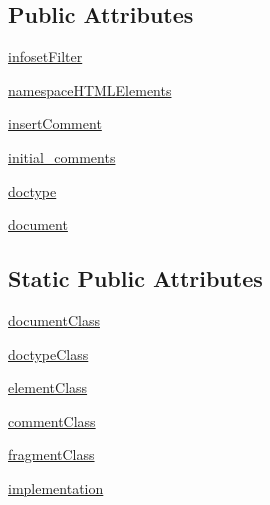 \subsection*{Public Attributes}
\begin{DoxyCompactItemize}
\item 
\hyperlink{classpip_1_1__vendor_1_1html5lib_1_1treebuilders_1_1etree__lxml_1_1TreeBuilder_a736bfdbe661982ba121bb4dcfd958591}{infoset\+Filter}
\item 
\hyperlink{classpip_1_1__vendor_1_1html5lib_1_1treebuilders_1_1etree__lxml_1_1TreeBuilder_aeea224b3d93acc67bdbc729992c7ad70}{namespace\+H\+T\+M\+L\+Elements}
\item 
\hyperlink{classpip_1_1__vendor_1_1html5lib_1_1treebuilders_1_1etree__lxml_1_1TreeBuilder_a7591236b31194f2fd655b8da87761723}{insert\+Comment}
\item 
\hyperlink{classpip_1_1__vendor_1_1html5lib_1_1treebuilders_1_1etree__lxml_1_1TreeBuilder_ab34ddb701de259acf247be3553d230d9}{initial\+\_\+comments}
\item 
\hyperlink{classpip_1_1__vendor_1_1html5lib_1_1treebuilders_1_1etree__lxml_1_1TreeBuilder_aa2f489d80120342bb7bad34db2a23a16}{doctype}
\item 
\hyperlink{classpip_1_1__vendor_1_1html5lib_1_1treebuilders_1_1etree__lxml_1_1TreeBuilder_ad10b13df5c46394889e1fc193a3f9ffc}{document}
\end{DoxyCompactItemize}
\subsection*{Static Public Attributes}
\begin{DoxyCompactItemize}
\item 
\hyperlink{classpip_1_1__vendor_1_1html5lib_1_1treebuilders_1_1etree__lxml_1_1TreeBuilder_a72d40b8ce5bb1212f20e253d1da17f48}{document\+Class}
\item 
\hyperlink{classpip_1_1__vendor_1_1html5lib_1_1treebuilders_1_1etree__lxml_1_1TreeBuilder_aca4bd528955d95d8a5745cdec872bd1e}{doctype\+Class}
\item 
\hyperlink{classpip_1_1__vendor_1_1html5lib_1_1treebuilders_1_1etree__lxml_1_1TreeBuilder_aabe47cc1ca66d4744dd1d98ad8e0d84e}{element\+Class}
\item 
\hyperlink{classpip_1_1__vendor_1_1html5lib_1_1treebuilders_1_1etree__lxml_1_1TreeBuilder_a187018abcbd1954ce42f0cff4e23449a}{comment\+Class}
\item 
\hyperlink{classpip_1_1__vendor_1_1html5lib_1_1treebuilders_1_1etree__lxml_1_1TreeBuilder_a951d2547fb1f1e39a7469337f7735496}{fragment\+Class}
\item 
\hyperlink{classpip_1_1__vendor_1_1html5lib_1_1treebuilders_1_1etree__lxml_1_1TreeBuilder_aeea6baa6b2f272c7b4a33193188db9c5}{implementation}
\end{DoxyCompactItemize}
